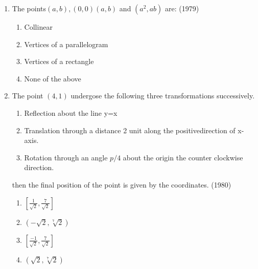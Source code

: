 \documentclass[12pt]{article}
\begin{document}
\begin{enumerate}
\item The points$(a,b),(0,0)(a,b)$ and $(a^2,ab)$ are: (1979)
\begin{enumerate}
\item Collinear
\item Vertices of a parallelogram
\item Vertices of a rectangle
\item None of the above
\end{enumerate}
\item The point $(4,1)$ undergose the following three transformations successively.
\begin{enumerate}[i]
\item Reflection about the line y=x\\
\item Translation through a distance 2 unit along the positivedirection of x-axis.\\
\item Rotation through an angle $p/4$ about the origin the counter clockwise direction.\\
\end{enumerate}

then the final position of the point is given by the coordinates. (1980)
\begin{enumerate}
\item  $[\frac{1}{\sqrt{2}},\frac{7}{\sqrt{2}}]$
\item  $(-\sqrt{2}, \sqrt[7]{2})$  
\item  $[\frac{-1}{\sqrt{2}},\frac{7}{\sqrt{2}}]$
\item  $(\sqrt{2}, \sqrt[7]{2})$
\end{enumerate}


\end{enumerate}
\end{document}
